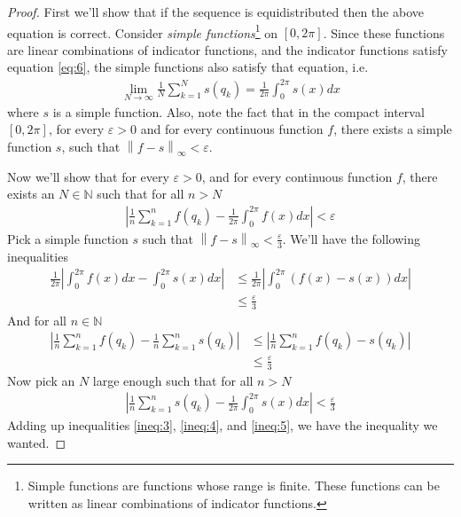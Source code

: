 \documentclass[12pt]{article}
\theoremstyle{definition}
\newcommand{\vep}{\varepsilon}
\newcommand{\norm}[1]{\left\lVert#1\right\rVert}
\begin{document}
\begin{proof}
    First we'll show that if the sequence is equidistributed then the above equation is correct. Consider \emph{simple functions}\footnote{Simple functions are functions whose range is finite. These functions can be written as linear combinations of indicator functions.} on $[0,2\pi]$. Since these functions are linear combinations of indicator functions, and the indicator functions satisfy equation \ref{eq:6}, the simple functions also satisfy that equation, i.e.
    \begin{align*}
        \lim\limits_{N \to \infty} \frac{1}{N} \sum_{k=1}^{N} s(q_k) = \frac{1}{2\pi} \int_{0}^{2\pi} s(x)dx
    \end{align*}
    where $s$ is a simple function. Also, note the fact that in the compact interval $[0, 2\pi]$, for every $\vep > 0$ and for every continuous function $f$, there exists a simple function $s$, such that $\norm{f - s}_\infty < \vep$.
    
    Now we'll show that for every $\vep >0$, and for every continuous function $f$, there exists an $N \in \mathbb{N}$ such that for all $n > N$
    \begin{align*}
        \left| \frac{1}{n} \sum_{k=1}^{n} f(q_k) - \frac{1}{2\pi} \int_{0}^{2\pi} f(x)dx \right| < \vep
    \end{align*}
    Pick a simple function $s$ such that $\norm{f-s}_\infty < \frac{\vep}{3}$. We'll have the following inequalities
    \begin{align}
        \frac{1}{2\pi}\left| \int_{0}^{2\pi} f(x)dx - \int_{0}^{2\pi} s(x)dx \right| &\leq \frac{1}{2\pi} \left| \int_{0}^{2\pi} (f(x) -s(x))dx \right| \\
        &\leq \frac{\vep}{3} \label{ineq:3}
    \end{align}
    And for all $n \in \mathbb{N}$
    \begin{align}
        \left| \frac{1}{n} \sum_{k=1}^{n} f(q_k) - \frac{1}{n} \sum_{k=1}^{n} s(q_k) \right| &\leq \left| \frac{1}{n} \sum_{k=1}^{n} f(q_k) -s(q_k) \right| \\
        &\leq \frac{\vep}{3} \label{ineq:4}
    \end{align}
    Now pick an $N$ large enough such that for all $n > N$
    \begin{align}
        \left| \frac{1}{n} \sum_{k=1}^{n} s(q_k) - \frac{1}{2\pi} \int_{0}^{2\pi} s(x)dx \right| < \frac{\vep}{3} \label{ineq:5}
    \end{align}
    Adding up inequalities \ref{ineq:3}, \ref{ineq:4}, and \ref{ineq:5}, we have the inequality we wanted.
    

\end{proof}
\end{document}
